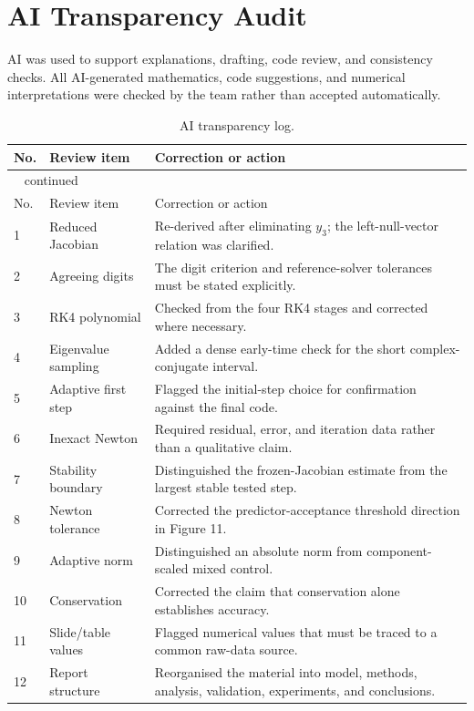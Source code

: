 \section{AI Transparency Audit}
AI was used to support explanations, drafting, code review, and consistency checks. All AI-generated mathematics, code suggestions, and numerical interpretations were checked by the team rather than accepted automatically. 

\small
\begin{longtable}{p{}p{}p{}}
\caption{AI transparency log.}\label{tab:ai-audit}\\
\toprule No.&Review item&Correction or action\\\midrule
\endfirsthead
\multicolumn{3}{l}{\tablename\ \thetable{} continued}\\
\toprule No.&Review item&Correction or action\\\midrule
\endhead
1&Reduced Jacobian&Re-derived after eliminating $y_3$; the left-null-vector relation was clarified.\\
2&Agreeing digits&The digit criterion and reference-solver tolerances must be stated explicitly.\\
3&RK4 polynomial&Checked from the four RK4 stages and corrected where necessary.\\
4&Eigenvalue sampling&Added a dense early-time check for the short complex-conjugate interval.\\
5&Adaptive first step&Flagged the initial-step choice for confirmation against the final code.\\
6&Inexact Newton&Required residual, error, and iteration data rather than a qualitative claim.\\
7&Stability boundary&Distinguished the frozen-Jacobian estimate from the largest stable tested step.\\
8&Newton tolerance&Corrected the predictor-acceptance threshold direction in Figure 11.\\
9&Adaptive norm&Distinguished an absolute norm from component-scaled mixed control.\\
10&Conservation&Corrected the claim that conservation alone establishes accuracy.\\
11&Slide/table values&Flagged numerical values that must be traced to a common raw-data source.\\
12&Report structure&Reorganised the material into model, methods, analysis, validation, experiments, and conclusions.\\

\end{longtable}
